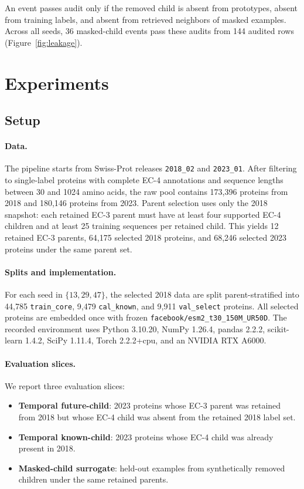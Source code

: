 \documentclass{article}
\begin{document}
An event passes audit only if the removed child is absent from prototypes, absent from training labels, and absent from retrieved neighbors of masked examples. Across all seeds, 36 masked-child events pass these audits from 144 audited rows (Figure~\ref{fig:leakage}).

\section{Experiments}
\label{sec:experiments}

\subsection{Setup}

\paragraph{Data.}
The pipeline starts from Swiss-Prot releases \texttt{2018\_02} and \texttt{2023\_01}. After filtering to single-label proteins with complete EC-4 annotations and sequence lengths between 30 and 1024 amino acids, the raw pool contains 173{,}396 proteins from 2018 and 180{,}146 proteins from 2023. Parent selection uses only the 2018 snapshot: each retained EC-3 parent must have at least four supported EC-4 children and at least 25 training sequences per retained child. This yields 12 retained EC-3 parents, 64{,}175 selected 2018 proteins, and 68{,}246 selected 2023 proteins under the same parent set.

\paragraph{Splits and implementation.}
For each seed in $\{13,29,47\}$, the selected 2018 data are split parent-stratified into 44{,}785 \texttt{train\_core}, 9{,}479 \texttt{cal\_known}, and 9{,}911 \texttt{val\_select} proteins. All selected proteins are embedded once with frozen \texttt{facebook/esm2\_t30\_150M\_UR50D}. The recorded environment uses Python 3.10.20, NumPy 1.26.4, pandas 2.2.2, scikit-learn 1.4.2, SciPy 1.11.4, Torch 2.2.2+cpu, and an NVIDIA RTX A6000.

\paragraph{Evaluation slices.}
We report three evaluation slices:
\begin{itemize}
\item \textbf{Temporal future-child}: 2023 proteins whose EC-3 parent was retained from 2018 but whose EC-4 child was absent from the retained 2018 label set.
\item \textbf{Temporal known-child}: 2023 proteins whose EC-4 child was already present in 2018.
\item \textbf{Masked-child surrogate}: held-out examples from synthetically removed children under the same retained parents.
\end{itemize}
\end{document}
